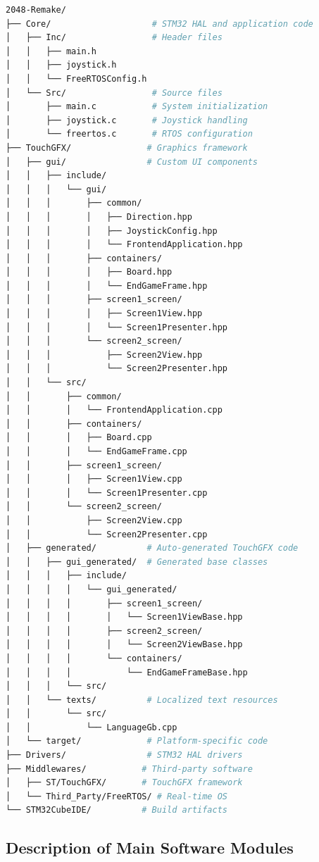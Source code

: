 \documentclass[12pt,a4paper]{article}
\begin{document}
\begin{lstlisting}[language=bash, caption=Project Directory Structure]
2048-Remake/
├── Core/                    # STM32 HAL and application code
│   ├── Inc/                 # Header files
│   │   ├── main.h
│   │   ├── joystick.h
│   │   └── FreeRTOSConfig.h
│   └── Src/                 # Source files
│       ├── main.c           # System initialization
│       ├── joystick.c       # Joystick handling
│       └── freertos.c       # RTOS configuration
├── TouchGFX/               # Graphics framework
│   ├── gui/                # Custom UI components
│   │   ├── include/
│   │   │   └── gui/
│   │   │       ├── common/
│   │   │       │   ├── Direction.hpp
│   │   │       │   ├── JoystickConfig.hpp
│   │   │       │   └── FrontendApplication.hpp
│   │   │       ├── containers/
│   │   │       │   ├── Board.hpp
│   │   │       │   └── EndGameFrame.hpp
│   │   │       ├── screen1_screen/
│   │   │       │   ├── Screen1View.hpp
│   │   │       │   └── Screen1Presenter.hpp
│   │   │       └── screen2_screen/
│   │   │           ├── Screen2View.hpp
│   │   │           └── Screen2Presenter.hpp
│   │   └── src/
│   │       ├── common/
│   │       │   └── FrontendApplication.cpp
│   │       ├── containers/
│   │       │   ├── Board.cpp
│   │       │   └── EndGameFrame.cpp
│   │       ├── screen1_screen/
│   │       │   ├── Screen1View.cpp
│   │       │   └── Screen1Presenter.cpp
│   │       └── screen2_screen/
│   │           ├── Screen2View.cpp
│   │           └── Screen2Presenter.cpp
│   ├── generated/          # Auto-generated TouchGFX code
│   │   ├── gui_generated/  # Generated base classes
│   │   │   ├── include/
│   │   │   │   └── gui_generated/
│   │   │   │       ├── screen1_screen/
│   │   │   │       │   └── Screen1ViewBase.hpp
│   │   │   │       ├── screen2_screen/
│   │   │   │       │   └── Screen2ViewBase.hpp
│   │   │   │       └── containers/
│   │   │   │           └── EndGameFrameBase.hpp
│   │   │   └── src/
│   │   └── texts/          # Localized text resources
│   │       └── src/
│   │           └── LanguageGb.cpp
│   └── target/             # Platform-specific code
├── Drivers/                # STM32 HAL drivers
├── Middlewares/           # Third-party software
│   ├── ST/TouchGFX/       # TouchGFX framework
│   └── Third_Party/FreeRTOS/ # Real-time OS
└── STM32CubeIDE/          # Build artifacts
\end{lstlisting}

\subsection{Description of Main Software Modules}
\end{document}
